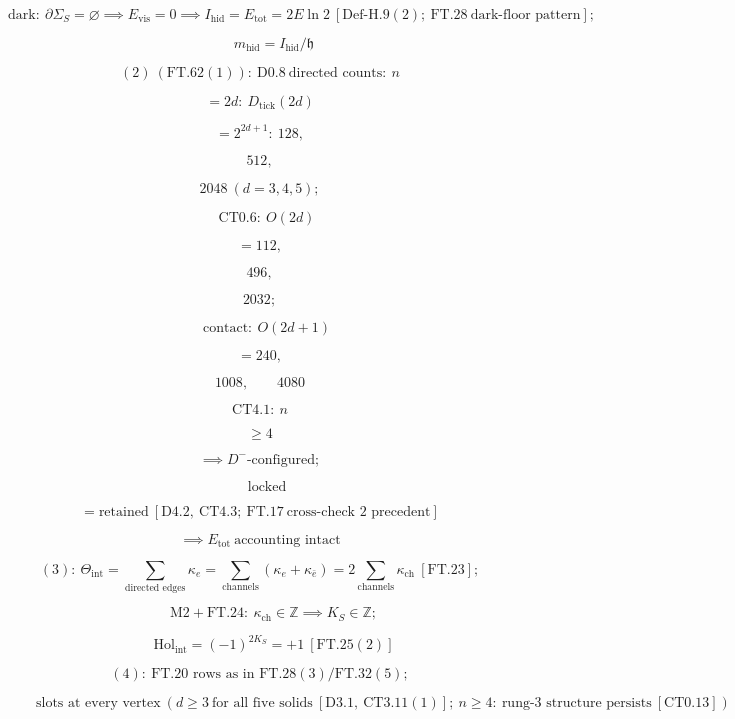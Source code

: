 \begin{theorem}
\[
\text{dark}:\ \partial\Sigma_S=\varnothing\implies E_{\mathrm{vis}}=0\implies I_{\mathrm{hid}}=E_{\mathrm{tot}}=2E\ln2\ [\mathrm{Def\text{-}H.9}(2);\ \mathrm{FT.28}\ \text{dark-floor pattern}];
\]

\[
\qquad m_{\mathrm{hid}}=I_{\mathrm{hid}}/\mathfrak h
\]

\[
(2)\ (\mathrm{FT.62}(1)):\ \mathrm{D0.8}\ \text{directed counts}:\ n
\]

\[
= 2d:\ D_{\mathrm{tick}}(2d)
\]

\[
= 2^{2d+1}:\ 128,
\]

\[
512,
\]

\[
2048\ (d=3,4,5);
\]

\[
\quad\mathrm{CT0.6}:\ O(2d)
\]

\[
= 112,
\]

\[
496,
\]

\[
2032;
\]

\[
\quad\text{contact}:\ O(2d{+}1)
\]

\[
= 240,
\]

\[
1008,\qquad 4080
\]

\[
\mathrm{CT4.1}:\ n
\]

\[
\ge 4
\]

\[
\implies D^-\text{-configured};
\]

\[
\quad\text{locked}
\]

\[
= \text{retained}\ [\mathrm{D4.2},\ \mathrm{CT4.3};\ \mathrm{FT.17}\ \text{cross-check 2 precedent}]
\]

\[
\implies E_{\mathrm{tot}}\ \text{accounting intact}
\]

\[
(3):\ \Theta_{\mathrm{int}}=\!\!\sum_{\text{directed edges}}\!\!\kappa_e=\!\!\sum_{\text{channels}}\!\!(\kappa_e+\kappa_{\bar e})=2\!\!\sum_{\text{channels}}\!\!\kappa_{\mathrm{ch}}\ [\mathrm{FT.23}];
\]

\[
\qquad \mathrm{M2}+\mathrm{FT.24}:\ \kappa_{\mathrm{ch}}\in\mathbb Z\implies K_S\in\mathbb Z;
\]

\[
\qquad \mathrm{Hol}_{\mathrm{int}}=(-1)^{2K_S}=+1\ [\mathrm{FT.25}(2)]
\]

\[
(4):\ \text{FT.20 rows as in FT.28}(3)/\mathrm{FT.32}(5);
\]

\[
\qquad \text{slots at every vertex}\ (d\ge3\ \text{for all five solids}\ [\mathrm{D3.1},\ \mathrm{CT3.11}(1)];\ n\ge4:\ \text{rung-3 structure persists}\ [\mathrm{CT0.13}])
\]


\end{theorem}
